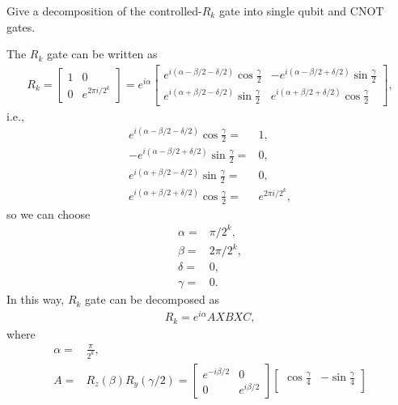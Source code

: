 \documentclass[en]{sol-man}
\begin{document}
\begin{exe}
    Give a decomposition of the controlled-$R_k$ gate into single qubit and CNOT gates.
\end{exe}
\begin{sol}
    The $R_k$ gate can be written as
    \begin{align}
        R_k=\begin{bmatrix}
            1&0\\
            0&e^{2\pi i/2^k}
        \end{bmatrix}=e^{i\alpha}\begin{bmatrix}
            e^{i(\alpha-\beta/2-\delta/2)}\cos\frac{\gamma}{2}&-e^{i(\alpha-\beta/2+\delta/2)}\sin\frac{\gamma}{2}\\
            e^{i(\alpha+\beta/2-\delta/2)}\sin\frac{\gamma}{2}&e^{i(\alpha+\beta/2+\delta/2)}\cos\frac{\gamma}{2}
        \end{bmatrix},
    \end{align}
    i.e.,
    \begin{align}
        e^{i(\alpha-\beta/2-\delta/2)}\cos\frac{\gamma}{2}=&1,\\
        -e^{i(\alpha-\beta/2+\delta/2)}\sin\frac{\gamma}{2}=&0,\\
        e^{i(\alpha+\beta/2-\delta/2)}\sin\frac{\gamma}{2}=&0,\\
        e^{i(\alpha+\beta/2+\delta/2)}\cos\frac{\gamma}{2}=&e^{2\pi i/2^k},
    \end{align}
    so we can choose
    \begin{align}
        \alpha=&\pi/2^k,\\
        \beta=&2\pi/2^k,\\
        \delta=&0,\\
        \gamma=&0.
    \end{align}
    In this way, $R_k$ gate can be decomposed as
    \begin{align}
        R_k=e^{i\alpha}AXBXC,
    \end{align}
    where
    \begin{align}
        \alpha=&\frac{\pi}{2^k},\\
        A=&R_z(\beta)R_y(\gamma/2)=\begin{bmatrix}
            e^{-i\beta/2}&0\\
            0&e^{i\beta/2}
        \end{bmatrix}\begin{bmatrix}
            \cos\frac{\gamma}{4}&-\sin\frac{\gamma}{4}\\

\end{bmatrix}
\end{align}
\end{sol}
\end{document}
